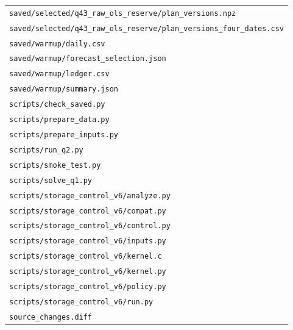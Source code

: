 \begin{longtable}{p{}}
\nolinkurl{saved/selected/q43_raw_ols_reserve/plan_versions.npz} \\

\nolinkurl{saved/selected/q43_raw_ols_reserve/plan_versions_four_dates.csv} \\

\nolinkurl{saved/warmup/daily.csv} \\

\nolinkurl{saved/warmup/forecast_selection.json} \\

\nolinkurl{saved/warmup/ledger.csv} \\

\nolinkurl{saved/warmup/summary.json} \\

\nolinkurl{scripts/check_saved.py} \\

\nolinkurl{scripts/prepare_data.py} \\

\nolinkurl{scripts/prepare_inputs.py} \\

\nolinkurl{scripts/run_q2.py} \\

\nolinkurl{scripts/smoke_test.py} \\

\nolinkurl{scripts/solve_q1.py} \\

\nolinkurl{scripts/storage_control_v6/analyze.py} \\

\nolinkurl{scripts/storage_control_v6/compat.py} \\

\nolinkurl{scripts/storage_control_v6/control.py} \\

\nolinkurl{scripts/storage_control_v6/inputs.py} \\

\nolinkurl{scripts/storage_control_v6/kernel.c} \\

\nolinkurl{scripts/storage_control_v6/kernel.py} \\

\nolinkurl{scripts/storage_control_v6/policy.py} \\

\nolinkurl{scripts/storage_control_v6/run.py} \\

\nolinkurl{source_changes.diff} \\


\end{longtable}
